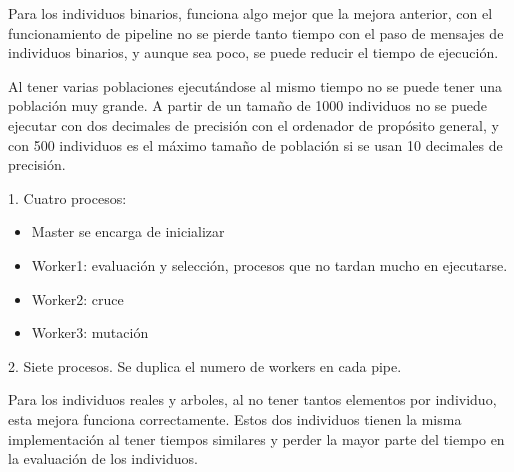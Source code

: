 		Para los individuos binarios, funciona algo mejor que la mejora anterior, con el funcionamiento de pipeline no se pierde tanto tiempo con el paso de mensajes de individuos binarios, y aunque sea poco, se puede reducir el tiempo de ejecución.
			
		Al tener varias poblaciones ejecutándose al mismo tiempo no se puede tener una población muy grande. A partir de un tamaño de 1000 individuos no se puede ejecutar con dos decimales de precisión con el ordenador de propósito general, y con 500 individuos es el máximo tamaño de población si se usan 10 decimales de precisión.
	 
	 
	\begin{flushleft}
	 	\begin{mdframed}[roundcorner=5pt]			 		
		 		\small
		 		\color{darkgreen} 1. Cuatro procesos: \color{black}
		 		\vspace{-0.3cm}
		 		\scriptsize
		 		\begin{itemize}
		 			\item Master se encarga de inicializar
		 			\vspace{-0.1cm}
		 			\item Worker1: evaluación y selección, procesos que no tardan mucho en ejecutarse.
		 			\vspace{-0.1cm}
		 			\item Worker2: cruce
		 			\vspace{-0.1cm}
		 			\item Worker3: mutación
		 		\end{itemize}
		 		\small
		 		\color{blue} 2. Siete procesos. \color{black} 	\scriptsize	Se duplica el numero de workers en cada pipe.
  
	 	\end{mdframed}
 		\end{flushleft}
		 		
	 Para los individuos reales y arboles, al no tener tantos elementos por individuo, esta mejora funciona correctamente. Estos dos individuos tienen la misma implementación al tener tiempos similares y perder la mayor parte del tiempo en la evaluación de los individuos.
	 
